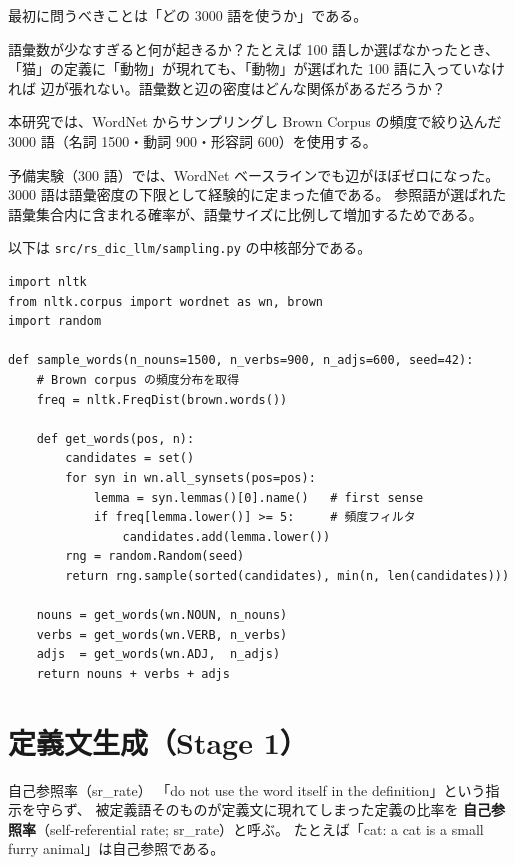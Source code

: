 \documentclass[lang=jp, color=black, mode=simple, 11pt]{elegantbook}
\begin{document}
最初に問うべきことは「どの 3000 語を使うか」である。

\begin{inquiry}
  語彙数が少なすぎると何が起きるか？たとえば 100 語しか選ばなかったとき、
  「猫」の定義に「動物」が現れても、「動物」が選ばれた 100 語に入っていなければ
  辺が張れない。語彙数と辺の密度はどんな関係があるだろうか？
\end{inquiry}

本研究では、WordNet からサンプリングし Brown Corpus の頻度で絞り込んだ
3000 語（名詞 1500・動詞 900・形容詞 600）を使用する。

\begin{note}
  予備実験（300 語）では、WordNet ベースラインでも辺がほぼゼロになった。
  3000 語は語彙密度の下限として経験的に定まった値である。
  参照語が選ばれた語彙集合内に含まれる確率が、語彙サイズに比例して増加するためである。
\end{note}

\begin{tryit}[語彙サンプリングコードを読む]
以下は \texttt{src/rs\_dic\_llm/sampling.py} の中核部分である。
\begin{lstlisting}[caption=WordNet から 3000 語をサンプリング]
import nltk
from nltk.corpus import wordnet as wn, brown
import random

def sample_words(n_nouns=1500, n_verbs=900, n_adjs=600, seed=42):
    # Brown corpus の頻度分布を取得
    freq = nltk.FreqDist(brown.words())

    def get_words(pos, n):
        candidates = set()
        for syn in wn.all_synsets(pos=pos):
            lemma = syn.lemmas()[0].name()   # first sense
            if freq[lemma.lower()] >= 5:     # 頻度フィルタ
                candidates.add(lemma.lower())
        rng = random.Random(seed)
        return rng.sample(sorted(candidates), min(n, len(candidates)))

    nouns = get_words(wn.NOUN, n_nouns)
    verbs = get_words(wn.VERB, n_verbs)
    adjs  = get_words(wn.ADJ,  n_adjs)
    return nouns + verbs + adjs
\end{lstlisting}
\end{tryit}

\section{定義文生成（Stage 1）}

\begin{dsterm}{自己参照率（sr\_rate）}
  「do not use the word itself in the definition」という指示を守らず、
  被定義語そのものが定義文に現れてしまった定義の比率を
  \textbf{自己参照率}（self-referential rate; sr\_rate）と呼ぶ。
  たとえば「cat: a cat is a small furry animal」は自己参照である。
\end{dsterm}
\end{document}
